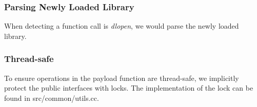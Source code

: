 \subsubsection{Parsing Newly Loaded Library}

When detecting a function call is {\em dlopen}, we would parse the newly loaded
library.

\subsubsection{Thread-safe}

To ensure operations in the payload function are thread-safe, we implicitly
protect the public interfaces with locks. The implementation of the lock can be
found in src/common/utils.cc.
